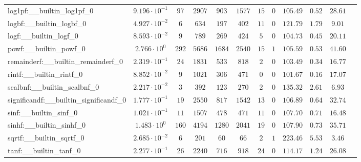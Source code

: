 \begin{tabular}{|l|c|c|c|c|c|c|c|c|c|c|c|}
log1pf:\_\_builtin\_log1pf\_0             & $ 9.196 \cdot 10^{-1} $ & $ 97     $ & $ 2907  $ & $ 903   $ & $ 1577  $ & $ 15  $ & $ 0 $ & $ 105.49      $ & $ 0.52    $ & $ 28.61   $ \\
logbf:\_\_builtin\_logbf\_0               & $ 4.927 \cdot 10^{-2} $ & $ 6      $ & $ 634   $ & $ 197   $ & $ 402   $ & $ 11  $ & $ 0 $ & $ 121.79      $ & $ 1.79    $ & $ 9.01    $ \\
logf:\_\_builtin\_logf\_0                 & $ 8.593 \cdot 10^{-2} $ & $ 9      $ & $ 789   $ & $ 269   $ & $ 424   $ & $ 5   $ & $ 0 $ & $ 104.73      $ & $ 0.45    $ & $ 20.11   $ \\
powf:\_\_builtin\_powf\_0                 & $ 2.766 \cdot 10^{0}  $ & $ 292    $ & $ 5686  $ & $ 1684  $ & $ 2540  $ & $ 15  $ & $ 1 $ & $ 105.59      $ & $ 0.53    $ & $ 41.60   $ \\
remainderf:\_\_builtin\_remainderf\_0     & $ 2.319 \cdot 10^{-1} $ & $ 24     $ & $ 1831  $ & $ 533   $ & $ 818   $ & $ 2   $ & $ 0 $ & $ 103.49      $ & $ 0.34    $ & $ 16.77   $ \\
rintf:\_\_builtin\_rintf\_0               & $ 8.852 \cdot 10^{-2} $ & $ 9      $ & $ 1021  $ & $ 306   $ & $ 471   $ & $ 0   $ & $ 0 $ & $ 101.67      $ & $ 0.16    $ & $ 17.07   $ \\
scalbnf:\_\_builtin\_scalbnf\_0           & $ 2.217 \cdot 10^{-2} $ & $ 3      $ & $ 392   $ & $ 123   $ & $ 270   $ & $ 2   $ & $ 0 $ & $ 135.32      $ & $ 2.61    $ & $ 6.93    $ \\
significandf:\_\_builtin\_significandf\_0 & $ 1.777 \cdot 10^{-1} $ & $ 19     $ & $ 2550  $ & $ 817   $ & $ 1542  $ & $ 13  $ & $ 0 $ & $ 106.89      $ & $ 0.64    $ & $ 32.74   $ \\
sinf:\_\_builtin\_sinf\_0                 & $ 1.021 \cdot 10^{-1} $ & $ 11     $ & $ 1507  $ & $ 478   $ & $ 471   $ & $ 11  $ & $ 0 $ & $ 107.70      $ & $ 0.71    $ & $ 16.48   $ \\
sinhf:\_\_builtin\_sinhf\_0               & $ 1.483 \cdot 10^{0}  $ & $ 160    $ & $ 4194  $ & $ 1280  $ & $ 2041  $ & $ 19  $ & $ 0 $ & $ 107.90      $ & $ 0.73    $ & $ 35.71   $ \\
sqrtf:\_\_builtin\_sqrtf\_0               & $ 2.685 \cdot 10^{-2} $ & $ 6      $ & $ 201   $ & $ 60    $ & $ 66    $ & $ 2   $ & $ 1 $ & $ 223.46      $ & $ 5.53    $ & $ 3.46    $ \\
tanf:\_\_builtin\_tanf\_0                 & $ 2.277 \cdot 10^{-1} $ & $ 26     $ & $ 2240  $ & $ 716   $ & $ 918   $ & $ 24  $ & $ 0 $ & $ 114.17      $ & $ 1.24    $ & $ 26.08   $ \\

\end{tabular}
